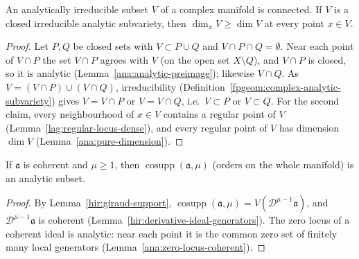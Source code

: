 \begin{lemma}
\label{bcalc:irreducible-connected}
\upstreamleanok
An analytically irreducible subset \(V\) of a complex manifold is connected. If \(V\) is a closed irreducible analytic subvariety, then
\(\dim_xV\ge\dim V\) at every point \(x\in V\).
\end{lemma}
\begin{proof}
\upstreamleanok
Let \(P,Q\) be closed sets with \(V\subset P\cup Q\) and \(V\cap P\cap Q=\emptyset\). Near each point of \(V\cap P\) the set \(V\cap P\) agrees with \(V\)
(on the open set \(X\setminus Q\)), and \(V\cap P\) is closed, so it is analytic (Lemma~\ref{ana:analytic-preimage}); likewise \(V\cap Q\). As
\(V=(V\cap P)\cup(V\cap Q)\), irreducibility (Definition~\ref{fpgeom:complex-analytic-subvariety}) gives \(V=V\cap P\) or \(V=V\cap Q\), i.e.\ \(V\subset P\)
or \(V\subset Q\). For the second claim, every neighbourhood of \(x\in V\) contains a regular point of \(V\) (Lemma~\ref{lag:regular-locus-dense}), and
every regular point of \(V\) has dimension \(\dim V\) (Lemma~\ref{ana:pure-dimension}).
\end{proof}

\begin{lemma}
\label{bcalc:cosupport-analytic}
\mixedleanok
If \(\mathfrak a\) is coherent and \(\mu\ge1\), then \(\operatorname{cosupp}(\mathfrak a,\mu)\) (orders on the whole manifold) is an analytic subset.
\end{lemma}
\begin{proof}
\mixedleanok
By Lemma~\ref{hir:giraud-support}, \(\operatorname{cosupp}(\mathfrak a,\mu)=V(\mathcal D^{\mu-1}\mathfrak a)\), and \(\mathcal D^{\mu-1}\mathfrak a\) is coherent
(Lemma~\ref{hir:derivative-ideal-generators}). The zero locus of a coherent ideal is analytic: near each point it is the common zero set of finitely
many local generators (Lemma~\ref{ana:zero-locus-coherent}).
\end{proof}

